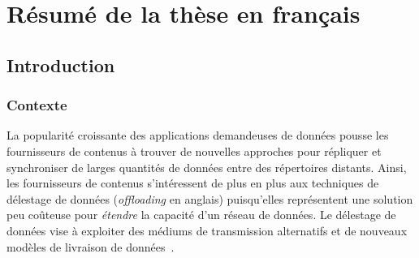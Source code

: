 \chapter{Résumé de la thèse en français} 

\section{Introduction}
\subsection{Contexte}

La popularité croissante des applications demandeuses de données pousse les fournisseurs de contenus à trouver de nouvelles approches pour répliquer et synchroniser de larges quantités de données entre des répertoires distants. Ainsi, les fournisseurs de contenus s’intéressent de plus en plus aux techniques de délestage de données (\textit{offloading} en anglais) puisqu’elles représentent une solution peu coûteuse pour \textit{étendre} la capacité d’un réseau de données. Le délestage de données vise à exploiter des médiums de transmission alternatifs et de nouveaux modèles de livraison de données~\cite{patterson2003conversation}. 

